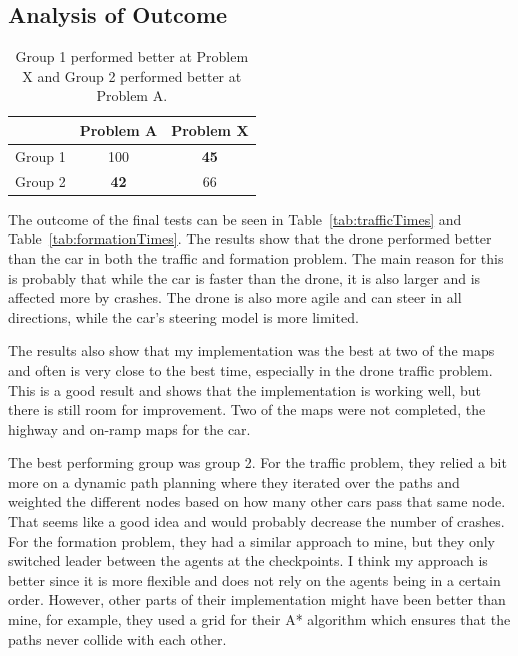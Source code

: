 \documentclass[a4paper,12pt]{article}
\begin{document}
\begin{multicols}{2}






\subsection{Analysis of Outcome}

\begin{table}
\begin{center}
\begin{tabular}{|c|c|c|}
\hline
 & Problem A & Problem X \\ \hline
Group 1 & 100 & \bf45 \\ \hline
Group 2  & \bf42 & 66 \\ \hline
\end{tabular}
\caption{Group 1 performed better at Problem X and Group 2 performed better at Problem A.}
\label{tab:results}
\end{center}
\end{table}

The outcome of the final tests can be seen in Table~\ref{tab:trafficTimes} and Table~\ref{tab:formationTimes}. The results show that the drone performed better than the car in both the traffic and formation problem. The main reason for this is probably that while the car is faster than the drone, it is also larger and is affected more by crashes. The drone is also more agile and can steer in all directions, while the car's steering model is more limited. 

The results also show that my implementation was the best at two of the maps and often is very close to the best time, especially in the drone traffic problem. This is a good result and shows that the implementation is working well, but there is still room for improvement. Two of the maps were not completed, the highway and on-ramp maps for the car.

The best performing group was group 2. For the traffic problem, they relied a bit more on a dynamic path planning where they iterated over the paths and weighted the different nodes based on how many other cars pass that same node. That seems like a good idea and would probably decrease the number of crashes. For the formation problem, they had a similar approach to mine, but they only switched leader between the agents at the checkpoints. I think my approach is better since it is more flexible and does not rely on the agents being in a certain order. However, other parts of their implementation might have been better than mine, for example, they used a grid for their A* algorithm which ensures that the paths never collide with each other.


\end{multicols}
\end{document}
